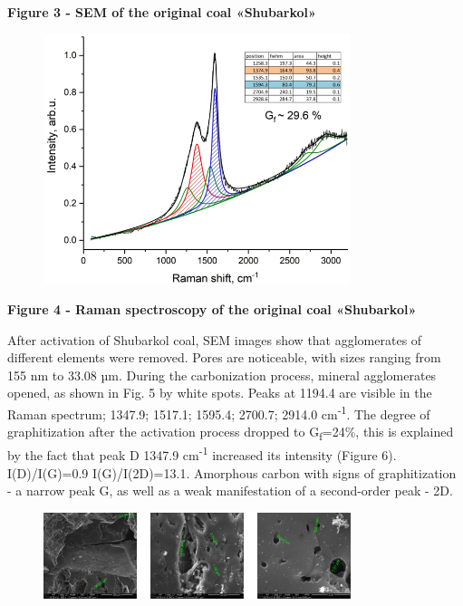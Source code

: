 {\bfseries Figure 3 - SEM of the original coal «Shubarkol»}

\begin{figure}[H]
	\centering
	\includegraphics[width=0.8\textwidth]{assets/56}
	\caption*{}
\end{figure}

{\bfseries Figure 4 - Raman spectroscopy of the original coal «Shubarkol»}

After activation of Shubarkol coal, SEM images show that agglomerates of
different elements were removed. Pores are noticeable, with sizes
ranging from 155 nm to 33.08 µm. During the carbonization process,
mineral agglomerates opened, as shown in Fig. 5 by white spots. Peaks at
1194.4 are visible in the Raman spectrum; 1347.9; 1517.1; 1595.4;
2700.7; 2914.0 cm\textsuperscript{-1}. The degree of graphitization
after the activation process dropped to G\textsubscript{f}=24\%, this is
explained by the fact that peak D 1347.9 cm\textsuperscript{-1}
increased its intensity (Figure 6). I(D)/I(G)=0.9 I(G)/I(2D)=13.1.
Amorphous carbon with signs of graphitization - a narrow peak G, as well
as a weak manifestation of a second-order peak - 2D.

\begin{figure}[H]
	\centering
	\includegraphics[width=0.8\textwidth]{assets/57}
	\caption*{}
\end{figure}

